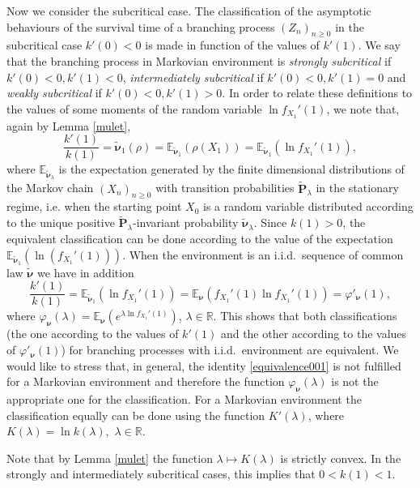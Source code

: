 \documentclass[12pt]{amsart}
\theoremstyle{definition}
\numberwithin{equation}{section}
\def\bb#1{\mathbb{#1}}
\def\bs#1{\boldsymbol{#1}}
\def\tbf#1{\tilde{\mathbf{#1}}}
\def\tbs#1{\tilde{\boldsymbol{#1}}}
\def\geq{\geqslant}
\def\phi{\varphi}
\renewcommand\ll{\lambda}
\begin{document}
Now we consider the subcritical case.
The classification of the asymptotic behaviours of the survival time of a branching process 
$\left( Z_n \right)_{n\geq 0}$ in the subcritical case $k'(0)<0$ 
is made in function of the values of $k'(1).$
We say that the branching process in Markovian environment is \textit{strongly subcritical} if $k'(0)<0, k'(1)<0$, \textit{intermediately subcritical} if $k'(0)<0, k'(1)=0$ 
and \textit{weakly subcritical} if $k'(0)<0, k'(1)>0$. In order to relate these definitions to the values of some moments of the random variable $\ln  f_{X_1}'(1)$,
we note that, again by Lemma \ref{mulet}, 
\begin{equation}
\label{subclassif}
\frac{k'(1)}{k(1)} = \tbs \nu_{1}(\rho) = \bb E_{\tbs \nu_{1}} \left( \rho(X_1) \right) = \bb E_{\tbs \nu_1} \left( \ln  f_{X_1}'(1) \right),
\end{equation}
where $\mathbb E_{\tbs \nu_{\ll}} $ is the expectation generated by the finite dimensional distributions 
of the Markov chain $( X_n )_{n\geq 0}$ with transition probabilities $\tbf P_{\ll}$
in the stationary regime, i.e. when the starting point $X_0$ is a random variable  
distributed according to the unique positive  $\tbf P_{\ll}$-invariant probability $\tbs \nu_{\ll}.$
Since $k(1)>0$, the equivalent classification can be done 
according to the value of the expectation $\bb E_{\tbs \nu_{1}} \left( \ln \left( f_{X_1}'(1) \right) \right)$. 
When the environment is an i.i.d.\ sequence of common law $\tbs \nu$ 
we have in addition
\begin{equation}
\label{equivalence001}
\frac{k'(1)}{k(1)} =\bb E_{\tbs \nu_{1}} \left( \ln  f_{X_1}'(1) \right)
=\bb E_{\bs \nu} \left(  f_{X_1}'(1) \ln  f_{X_1}'(1)  \right)=\phi'_{\bs \nu}(1),
\end{equation}
where $\phi_{\bs \nu}(\ll)=\bb E_{\bs \nu} \left( e^{\ll\ln  f_{X_1}'(1)} \right)$, $\ll \in \bb R.$
This shows that both classifications 
(the one according to the values of $k'(1)$ and the other according to the values of $\phi'_{\bs \nu}(1)$) 
for branching processes with i.i.d.\ environment are equivalent.  
We would like to stress that, in general, the identity
\eqref{equivalence001} is not fulfilled for a Markovian environment and therefore
the function $\phi_{\bs \nu}(\ll)$ is not the appropriate one for the classification.
For a Markovian environment the classification equally can be done using the function $K'(\ll)$, 
where $K(\ll)=\ln k(\ll),$ $\ll \in \mathbb R.$

Note that by Lemma \ref{mulet} the function 
$\ll \mapsto K(\ll)$ is strictly convex. 
In the strongly and intermediately subcritical cases, this implies that $0<k(1)<1.$
\end{document}
